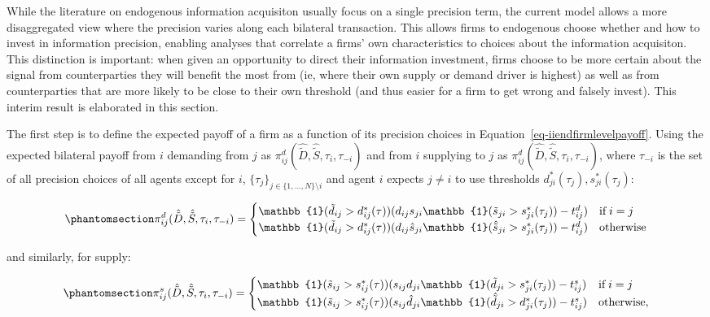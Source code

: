 \documentclass[
]{article}
\theoremstyle{plain}
\theoremstyle{definition}
\theoremstyle{remark}
\begin{document}
While the literature on endogenous information acquisiton usually focus
on a single precision term, the current model allows a more
disaggregated view where the precision varies along each bilateral
transaction. This allows firms to endogenous choose whether and how to
invest in information precision, enabling analyses that correlate a
firms' own characteristics to choices about the information acquisiton.
This distinction is important: when given an opportunity to direct their
information investment, firms choose to be more certain about the signal
from counterparties they will benefit the most from (ie, where their own
supply or demand driver is highest) as well as from counterparties that
are more likely to be close to their own threshold (and thus easier for
a firm to get wrong and falsely invest). This interim result is
elaborated in this section.

The first step is to define the expected payoff of a firm as a function
of its precision choices in Equation~\ref{eq-iiendfirmlevelpayoff}.
Using the expected bilateral payoff from \(i\) demanding from \(j\) as
\(\pi_{ij}^d(\hat{\tilde{D}}, \hat{\tilde{S}}, \tau_i, \tau_{-i})\) and
from \(i\) supplying to \(j\) as
\(\pi_{ij}^d(\hat{\tilde{D}}, \hat{\tilde{S}}, \tau_i, \tau_{-i})\),
where \(\tau_{-i}\) is the set of all precision choices of all agents
except for \(i\), \(\{\tau_j\}_{j \in \{1, \dots, N\}\setminus i}\) and
agent \(i\) expects \(j \neq i\) to use thresholds
\(d_{ji}^*(\tau_j), s_{ji}^*(\tau_j)\):

\begin{equation}\phantomsection\label{eq-bilateralpayoffD}{
\pi_{ij}^d(\hat{\tilde{D}}, \hat{\tilde{S}}, \tau_i, \tau_{-i}) = 
\begin{cases}
\mathbb{1}(\tilde{d}_{ij}>d_{ij}^*(\tau)) (d_{ij} s_{ji}\mathbb{1}(\tilde{s}_{ji}>s_{ji}^*(\tau_j)) - t_{ij}^d) & \text{if} \; i = j \\
\mathbb{1}(\tilde{d}_{ij}>d_{ij}^*(\tau)) (d_{ij} \hat{s}_{ji}\mathbb{1}(\hat{\tilde{s}}_{ji}>s_{ji}^*(\tau_j)) - t_{ij}^d) & \text{otherwise}
\end{cases}
}\end{equation}

and similarly, for supply:

\begin{equation}\phantomsection\label{eq-bilateralpayoffS}{
\pi_{ij}^s(\hat{\tilde{D}}, \hat{\tilde{S}}, \tau_i, \tau_{-i}) = 
\begin{cases}
\mathbb{1}(\tilde{s}_{ij}>s_{ij}^*(\tau)) (s_{ij} d_{ji}\mathbb{1}(\tilde{d}_{ji}>s_{ji}^*(\tau_j)) - t_{ij}^s) & \text{if} \; i = j \\
\mathbb{1}(\tilde{s}_{ij}>s_{ij}^*(\tau)) (s_{ij} \hat{d}_{ji}\mathbb{1}(\hat{\tilde{d}}_{ji}>d_{ji}^*(\tau_j)) - t_{ij}^s) & \text{otherwise},
\end{cases}
}\end{equation}
\end{document}
